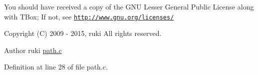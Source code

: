 You should have received a copy of the G\-N\-U Lesser General Public License along with T\-Box; If not, see \href{http://www.gnu.org/licenses/}{\tt http\-://www.\-gnu.\-org/licenses/}

Copyright (C) 2009 -\/ 2015, ruki All rights reserved.

\begin{DoxyAuthor}{Author}
ruki  \hyperlink{path_8c_source}{path.\-c} 
\end{DoxyAuthor}


Definition at line 28 of file path.\-c.

